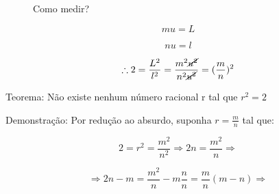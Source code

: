 \documentclass[a4paper, 12pt]{article}
\begin{document}
    \begin{figure} [h!]
        \begin{minipage}[!] {0.4\linewidth}
            \caption{}
        \end{minipage}
        \begin{minipage}[!] {0.4\linewidth}
            {Como medir?}
    
            \[mu = L\]
    
            \[nu = l\]
    
            \[\therefore 2 = \frac{L^2}{l^2} = \frac{m^2 \cancel{u^2}}{n^2 \cancel{u^2}} = (\frac{m}{n})^2\] \newline
        \end{minipage}
    \end{figure} 
    
    {Teorema: Não existe nenhum número racional r tal que $r^2 = 2$} \newline
    
    {Demonstração: Por redução ao absurdo, suponha $r= \frac{m}{n}$ tal que:}
    
    \[2=r^2 = \frac{m^2}{n^2} \Rightarrow 2n = \frac{m^2}{n} \Rightarrow \]
    
    \[\Rightarrow 2n - m = \frac{m^2}{n} - m\frac{n}{n} = \frac{m}{n} (m-n) \Rightarrow\] 
    
\end{document}
